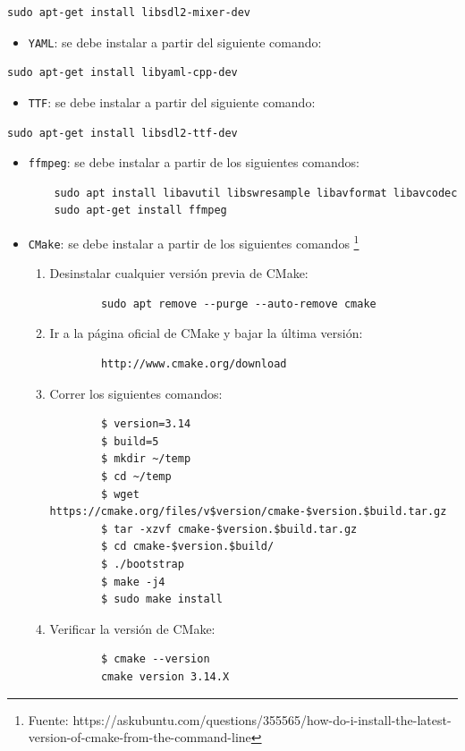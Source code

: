 \documentclass[a4paper]{article}
\begin{document}
\begin{verbatim}
sudo apt-get install libsdl2-mixer-dev
\end{verbatim}

\begin{itemize}
	\item \texttt{YAML}: se debe instalar a partir del siguiente comando:
\end{itemize}

\begin{verbatim}
sudo apt-get install libyaml-cpp-dev
\end{verbatim}

\begin{itemize}
	\item \texttt{TTF}: se debe instalar a partir del siguiente comando:
\end{itemize}

\begin{verbatim}
sudo apt-get install libsdl2-ttf-dev
\end{verbatim}

\begin{itemize}
	\item \texttt{ffmpeg}: se debe instalar a partir de los siguientes comandos:
	
	\begin{verbatim}
	sudo apt install libavutil libswresample libavformat libavcodec
	sudo apt-get install ffmpeg
	\end{verbatim}
\end{itemize}

\begin{itemize}
	\item \texttt{CMake}: se debe instalar a partir de los siguientes comandos \footnote{Fuente: https://askubuntu.com/questions/355565/how-do-i-install-the-latest-version-of-cmake-from-the-command-line}
	
	\begin{enumerate}
		\item Desinstalar cualquier versión previa de CMake:
		\begin{verbatim}
		sudo apt remove --purge --auto-remove cmake
		\end{verbatim}
		\item Ir a la página oficial de CMake y bajar la última versión: 
		\begin{verbatim}
		http://www.cmake.org/download
		\end{verbatim}
		\item Correr los siguientes comandos:
		\begin{verbatim}
		$ version=3.14
		$ build=5
		$ mkdir ~/temp
		$ cd ~/temp
		$ wget https://cmake.org/files/v$version/cmake-$version.$build.tar.gz
		$ tar -xzvf cmake-$version.$build.tar.gz
		$ cd cmake-$version.$build/
		$ ./bootstrap
		$ make -j4
		$ sudo make install
		\end{verbatim}
		\item Verificar la versión de CMake:
		\begin{verbatim}
		$ cmake --version
		cmake version 3.14.X
		\end{verbatim}
	\end{enumerate}
\end{itemize}
\end{document}
